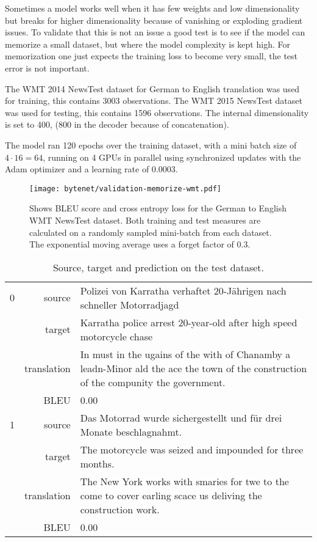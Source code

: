 Sometimes a model works well when it has few weights and low dimensionality but breaks for higher dimensionality because of vanishing or exploding gradient issues. To validate that this is not an issue a good test is to see if the model can memorize a small dataset, but where the model complexity is kept high. For memorization one just expects the training loss to become very small, the test error is not important.

The WMT 2014 NewsTest dataset for German to English translation was used for training, this contains 3003 observations. The WMT 2015 NewsTest dataset was used for testing, this contains 1596 observations. The internal dimensionality is set to 400, (800 in the decoder because of concatenation).

The model ran 120 epochs over the training dataset, with a mini batch size of ${4 \cdot 16 = 64}$, running on 4 GPUs in parallel using synchronized updates with the Adam optimizer and a learning rate of 0.0003.

\begin{figure}[h]
    \centering
    \texttt{[image: bytenet/validation-memorize-wmt.pdf]}
    \caption{Shows BLEU score and cross entropy loss for the German to English WMT NewsTest dataset. Both training and test measures are calculated on a randomly sampled mini-batch from each dataset. The exponential moving average uses a forget factor of $0.3$.}
    \label{fig:result:bytenet:wmt}
\end{figure}

\begin{table}[h]
\centering
\begin{tabular}{l|r|p{10cm}}
  0 & source & Polizei von Karratha verhaftet 20-Jährigen nach schneller Motorradjagd \\[0.1cm]
    & target & Karratha police arrest 20-year-old after high speed motorcycle chase \\[0.1cm]
    & translation & In must in the ugains of the with of Chanamby a leadn-Minor ald the ace the town of the construction of the compunity the government. \\[0.1cm]
    & BLEU & 0.00 \\[0.1cm] \hline
  1 & source & Das Motorrad wurde sichergestellt und für drei Monate beschlagnahmt. \\[0.1cm]
    & target & The motorcycle was seized and impounded for three months. \\[0.1cm]
    & translation & The New York works with smaries for twe to the come to cover earling scace us deliving the construction work. \\[0.1cm]
    & BLEU & 0.00
\end{tabular}
\caption{Source, target and prediction on the test dataset.}
\label{table:result:bytenet:wmt-test}
\end{table}

